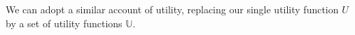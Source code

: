 



We can adopt a similar account of utility, replacing our single utility function
$U$ by a set of utility functions $\mathbb{U}$.

